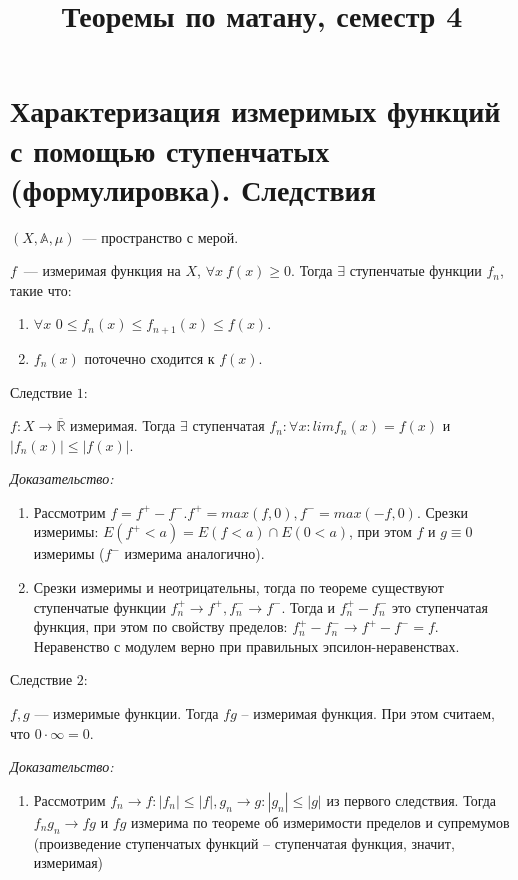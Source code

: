 \documentclass[paper=a4, fontsize=13.2pt]{article}
\title{Теоремы по матану, семестр 4}
\begin{document}
\maketitle
\tableofcontents
\newpage

\section{Характеризация измеримых функций с помощью ступенчатых (формулировка). Следствия}
$(X,\mathds{A},\mu)$~--- пространство с мерой.

$f$~--- измеримая функция на $X$, $\forall x\ f(x) \geq 0$. Тогда $\exists$ ступенчатые функции $f_n$, такие что:
\begin{enumerate}
    \item $\forall x$ $0 \leq f_n(x) \leq f_{n+1}(x) \leq f(x)$.
    \item $f_n(x)$ поточечно сходится к $f(x)$.
\end{enumerate}

Следствие $1$:

$f: X \rightarrow \overline {\mathds{R}}$ измеримая. Тогда $\exists$ ступенчатая $f_n: \forall x:  lim f_n(x) = f(x)$ и $|f_n(x)| \leq |f(x)|$.

\emph{Доказательство:}

\begin{enumerate}
	\item Рассмотрим $f = f^+ - f^-. f^+ = max(f, 0), f^- = max(-f, 0)$. Срезки измеримы: $E(f^+  < a) = E(f < a) \cap E(0 < a)$, при этом $f$  и $g \equiv 0$ измеримы ($f^-$ измерима аналогично).
	\item Срезки измеримы и неотрицательны, тогда по теореме существуют ступенчатые функции $f^+_n \rightarrow f^+, f^-_n \rightarrow f^-$. Тогда и $f^+_n - f^-_n$ это ступенчатая функция, при этом по свойству пределов: $f^+_n - f^-_n \rightarrow f^+ - f^- = f$. Неравенство с модулем верно при правильных эпсилон-неравенствах.
\end{enumerate}

Следствие $2$:

$f, g$ --- измеримые функции. Тогда $fg$ -- измеримая функция. При этом считаем, что $0 \cdot \infty = 0$.

\emph{Доказательство:}
\begin{enumerate}
	\item Рассмотрим $f_n \rightarrow f: |f_n| \leq |f|, g_n \rightarrow g: |g_n| \leq |g|$ из первого следствия. Тогда $f_ng_n \rightarrow fg$ и $fg$ измерима по теореме об измеримости пределов и супремумов (произведение ступенчатых функций -- ступенчатая функция, значит, измеримая)
\end{enumerate}
\end{document}
